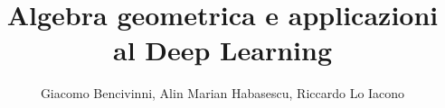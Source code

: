 \documentclass{beamer}
\title{Algebra geometrica e applicazioni al Deep Learning}
\author{Giacomo Bencivinni, Alin Marian Habasescu, Riccardo Lo Iacono}
\begin{document}
\begin{frame}
    \maketitle
\end{frame}




\end{document}
